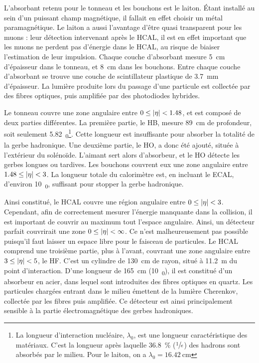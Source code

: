 L'absorbant retenu pour le tonneau et les bouchons est le laiton. Étant installé au sein d'un puissant champ magnétique, il fallait en effet choisir un métal paramagnétique. Le laiton a aussi l'avantage d'être quasi transparent pour les muons : leur détection intervenant après le HCAL, il est en effet important que les muons ne perdent pas d'énergie dans le HCAL, au risque de biaiser l'estimation de leur impulsion. Chaque couche d'absorbant mesure \SI{5}{\cm} d'épaisseur dans le tonneau, et \SI{8}{\cm} dans les bouchons. Entre chaque couche d'absorbant se trouve une couche de scintillateur plastique de \SI{3.7}{\mm} d'épaisseur. La lumière produite lors du passage d'une particule est collectée par des fibres optiques, puis amplifiée par des photodiodes hybrides.

\medskip

Le tonneau couvre une zone angulaire entre $0 \leq \lvert \eta \rvert < \num{1.48}$, et est composé de deux parties différentes. La première partie, le HB, mesure \SI{89}{\cm} de profondeur, soit seulement \SI{5.82}{\lambda_0}\footnote{La longueur d'interaction nucléaire, $\lambda_0$, est une longueur caractéristique des matériaux. C'est la longueur après laquelle \SI{36.8}{\%} ($\sfrac{1}{e}$) des hadrons sont absorbés par le milieu. Pour le laiton, on a $\lambda_0 = \SI{16.42}{\cm}$}. Cette longueur est insuffisante pour absorber la totalité de la gerbe hadronique. Une deuxième partie, le HO, a donc été ajouté, située à l'extérieur du solénoïde. L'aimant sert alors d'absorbeur, et le HO détecte les gerbes longues ou tardives. Les bouchons couvrent eux une zone angulaire entre $1.48 \leq \lvert \eta \rvert < \num{3}$. La longueur totale du calorimètre est, en incluant le ECAL, d'environ \SI{10}{\lambda_0}, suffisant pour stopper la gerbe hadronique.

\bigskip

Ainsi constitué, le HCAL couvre une région angulaire entre $0 \leq \lvert \eta \rvert < \num{3}$. Cependant, afin de correctement mesurer l'énergie manquante dans la collision, il est important de couvrir au maximum tout l'espace angulaire. Ainsi, un détecteur parfait couvrirait une zone $0 \leq \lvert \eta \rvert < \infty$. Ce n'est malheureusement pas possible puisqu'il faut laisser un espace libre pour le faisceau de particules. Le HCAL comprend une troisième partie, plus à l'avant, couvrant une zone angulaire entre $\num{3} \leq \lvert \eta \rvert < \num{5}$, le HF. C'est un cylindre de \SI{130}{\cm} de rayon, situé à \SI{11.2}{\m} du point d'interaction. D'une longueur de \SI{165}{\cm} (\tilde \SI{10}{\lambda_0}), il est constitué d'un absorbeur en acier, dans lequel sont introduites des fibres optiques en quartz. Les particules chargées entrant dans le milieu émettent de la lumière Cherenkov, collectée par les fibres puis amplifiée. Ce détecteur est ainsi principalement sensible à la partie électromagnétique des gerbes hadroniques.

